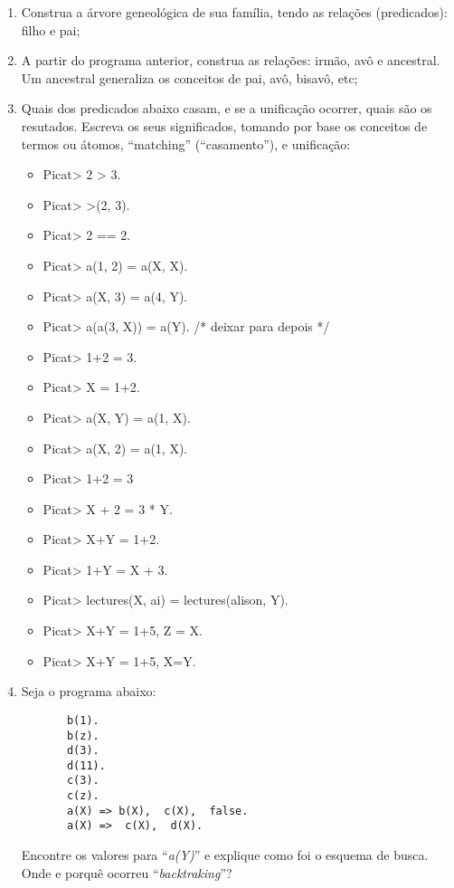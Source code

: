 \documentclass[12pt,a4paper]{article}
\begin{document}
\begin{enumerate}
\item Construa a árvore geneológica de sua família, tendo as relações (predicados): filho e pai;

\item A partir do programa anterior, construa as relações: irmão, avô e ancestral. Um ancestral generaliza os conceitos de pai, avô, bisavô, etc;

\item Quais dos predicados abaixo casam, e se a unificação ocorrer, quais são os resutados. Escreva os seus significados, tomando por base os conceitos de termos ou átomos, ``matching''\/ (``casamento''\/), e unificação:
\begin{itemize}
\item Picat> 2 > 3.
\item Picat>  >(2, 3).
\item Picat>  2 == 2.
\item  Picat>   a(1, 2) = a(X, X). 
\item  Picat>   a(X, 3) = a(4, Y). 
\item  Picat>   a(a(3, X)) = a(Y).  /* deixar para depois */
\item  Picat>  1+2 = 3. 
\item  Picat>   X = 1+2. 
\item  Picat>   a(X, Y) = a(1, X). 
\item  Picat>   a(X, 2) = a(1, X). 
\item  Picat> 1+2 = 3
\item  Picat> X + 2 = 3 * Y.
\item  Picat> X+Y = 1+2.
\item  Picat> 1+Y = X + 3.
\item  Picat> lectures(X, ai) = lectures(alison, Y).
\item  Picat> X+Y = 1+5, Z = X.
\item  Picat> X+Y = 1+5, X=Y.
\end{itemize}

\item Seja o programa abaixo:
\begin{verbatim}
       b(1).                             
       b(z).                            
       d(3).
       d(11).
       c(3).
       c(z).
       a(X) => b(X),  c(X),  false.
       a(X) =>  c(X),  d(X).
\end{verbatim}
Encontre os valores para\/ ``{\em a(Y)}''\/ e explique como foi o esquema de busca. Onde e porquê ocorreu
\/ ``{\it backtraking}''?



\end{enumerate}
\end{document}
